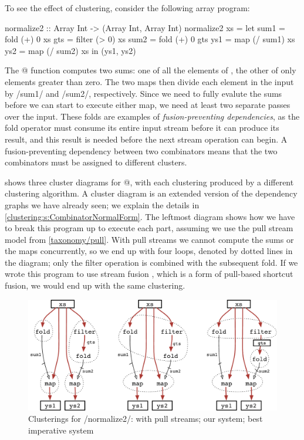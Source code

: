 To see the effect of clustering, consider the following array program:

\begin{haskell}
normalize2 :: Array Int -> (Array Int, Array Int)
normalize2 xs
 = let sum1 = fold   (+)  0   xs
       gts  = filter (>   0)  xs
       sum2 = fold   (+)  0   gts
       ys1  = map    (/ sum1) xs
       ys2  = map    (/ sum2) xs
   in (ys1, ys2)
\end{haskell}

The @ function computes two sums: one of all the elements of \Hs@xs@, the other of only elements greater than zero.
The two maps then divide each element in the input \Hs@xs@ by \Hs/sum1/ and \Hs/sum2/, respectively.
Since we need to fully evalute the sums before we can start to execute either map, we need at least two separate passes over the input.
These folds are examples of \emph{fusion-preventing dependencies}, as the fold operator must consume its entire input stream before it can produce its result, and this result is needed before the next stream operation can begin.
A fusion-preventing dependency between two combinators means that the two combinators must be assigned to different clusters.

 shows three cluster diagrams for @, with each clustering produced by a different clustering algorithm.
A cluster diagram is an extended version of the dependency graphs we have already seen; we explain the details in \cref{clustering:s:CombinatorNormalForm}.
The leftmost diagram shows how we have to break this program up to execute each part, assuming we use the pull stream model from \cref{taxonomy/pull}.
With pull streams we cannot compute the sums or the maps concurrently, so we end up with four loops, denoted by dotted lines in the diagram; only the filter operation is combined with the subsequent fold.
If we wrote this program to use stream fusion \citep{coutts2007stream}, which is a form of pull-based shortcut fusion, we would end up with the same clustering.

\begin{figure}
\begin{center}
\includegraphics[scale=0.7]{copy/03-body/clustering/figures/ex1-compare.pdf}
\end{center}
\caption{Clusterings for \Hs/normalize2/: with pull streams; our system; best imperative system}
\label{clustering:f:normalize2-clusterings}
\end{figure}


